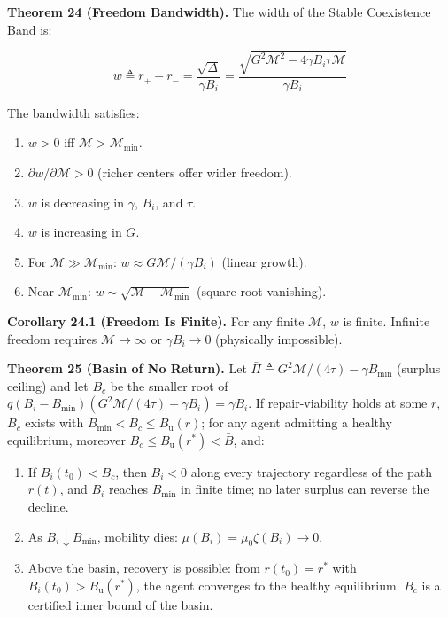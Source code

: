 \documentclass[11pt]{article}
\begin{document}
\textbf{Theorem 24 (Freedom Bandwidth).} The width of the Stable
Coexistence Band is:

\[w \triangleq r_+ - r_- = \frac{\sqrt{\Delta}}{\gamma B_i} = \frac{\sqrt{G^2\mathcal{M}^2 - 4\gamma B_i \tau \mathcal{M}}}{\gamma B_i}\]

The bandwidth satisfies:

\begin{enumerate}
\def\labelenumi{(\alph{enumi})}
\item
  \(w > 0\) iff \(\mathcal{M} > \mathcal{M}_{\min}\).
\item
  \(\partial w / \partial \mathcal{M} > 0\) (richer centers offer wider
  freedom).
\item
  \(w\) is decreasing in \(\gamma\), \(B_i\), and \(\tau\).
\item
  \(w\) is increasing in \(G\).
\item
  For \(\mathcal{M} \gg \mathcal{M}_{\min}\):
  \(w \approx G\mathcal{M}/(\gamma B_i)\) (linear growth).
\item
  Near \(\mathcal{M}_{\min}\):
  \(w \sim \sqrt{\mathcal{M} - \mathcal{M}_{\min}}\) (square-root
  vanishing).
\end{enumerate}

\textbf{Corollary 24.1 (Freedom Is Finite).} For any finite
\(\mathcal{M}\), \(w\) is finite. Infinite freedom requires
\(\mathcal{M} \to \infty\) or \(\gamma B_i \to 0\) (physically
impossible).

\textbf{Theorem 25 (Basin of No Return).} Let
\(\bar{\Pi} \triangleq G^2\mathcal{M}/(4\tau) - \gamma B_{\min}\)
(surplus ceiling) and let \(B_c\) be the smaller root of
\(q(B_i - B_{\min})(G^2\mathcal{M}/(4\tau) - \gamma B_i) = \gamma B_i\).
If repair-viability holds at some \(r\), \(B_c\) exists with
\(B_{\min} < B_c \leq B_{\mathrm{u}}(r)\); for any agent admitting a
healthy equilibrium, moreover
\(B_c \leq B_{\mathrm{u}}(r^*) < \bar{B}\), and:

\begin{enumerate}
\def\labelenumi{(\alph{enumi})}
\item
  If \(B_i(t_0) < B_c\), then \(\dot{B}_i < 0\) along every trajectory
  regardless of the path \(r(t)\), and \(B_i\) reaches \(B_{\min}\) in
  finite time; no later surplus can reverse the decline.
\item
  As \(B_i \downarrow B_{\min}\), mobility dies:
  \(\mu(B_i) = \mu_0\zeta(B_i) \to 0\).
\item
  Above the basin, recovery is possible: from \(r(t_0) = r^*\) with
  \(B_i(t_0) > B_{\mathrm{u}}(r^*)\), the agent converges to the healthy
  equilibrium. \(B_c\) is a certified inner bound of the basin.
\end{enumerate}
\end{document}
